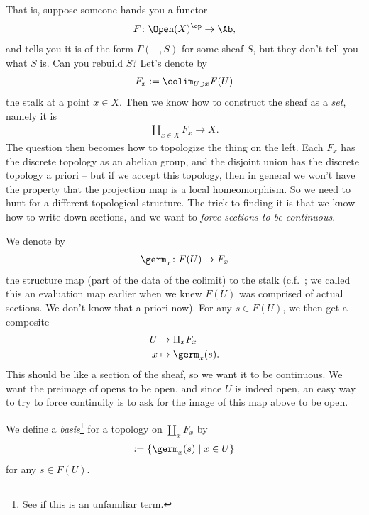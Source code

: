 \documentclass[11pt]{book}
\begin{document}
That is, suppose someone hands you a functor
\begin{align*}
    F \colon \Open(X)^\op \to \Ab,
\end{align*}
and tells you it is of the form $\Gamma(-,S)$ for some sheaf $S$, but they don't tell you what $S$ is. Can you rebuild $S$? Let's denote by
\begin{align*}
    F_x := \colim_{U\ni x} F(U)
\end{align*}
the stalk at a point $x\in X$. Then we know how to construct the sheaf as a \emph{set}, namely it is
\begin{align*}
    \amalg_{x\in X} F_x \to X.
\end{align*}
The question then becomes how to topologize the thing on the left. Each $F_x$ has the discrete topology as an abelian group, and the disjoint union has the discrete topology a priori -- but if we accept this topology, then in general we won't have the property that the projection map is a local homeomorphism. So we need to hunt for a different topological structure. The trick to finding it is that we know how to write down sections, and we want to \emph{force sections to be continuous}.

We denote by
\begin{align*}
    \germ_x \colon F(U) \to F_x
\end{align*}
the structure map (part of the data of the colimit) to the stalk (c.f.~; we called this an evaluation map earlier when we knew $F(U)$ was comprised of actual sections. We don't know that a priori now). For any $s\in F(U)$, we then get a composite
\begin{align*}
    U &\to \amalg_x F_x \\
    x &\mapsto \germ_x(s).
\end{align*}
This should be like a section of the sheaf, so we want it to be continuous. We want the preimage of opens to be open, and since $U$ is indeed open, an easy way to try to force continuity is to ask for the image of this map above to be open.

\begin{definition}\label{def:basis-for-topology-on-espace-etale} 
We define a \emph{basis}\footnote{See \cite[II\S13]{Munkres} if this is an unfamiliar term.} for a topology on $\amalg_x F_x$ by
\begin{align*}
    [(s,U)] := \left\{ \germ_x(s) \mid x\in U \right\}
\end{align*}
for any $s\in F(U)$.
\end{definition}
\end{document}

